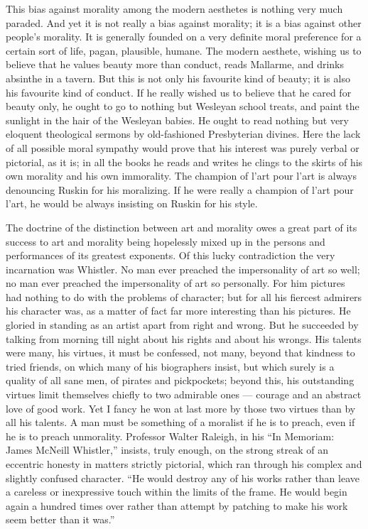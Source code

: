 This bias against morality among the modern aesthetes is nothing very much paraded. And yet it is not really a bias against morality; it is a bias against other people’s morality. It is generally founded on a very definite moral preference for a certain sort of life, pagan, plausible, humane. The modern aesthete, wishing us to believe that he values beauty more than conduct, reads Mallarme, and drinks absinthe in a tavern. But this is not only his favourite kind of beauty; it is also his favourite kind of conduct. If he really wished us to believe that he cared for beauty only, he ought to go to nothing but Wesleyan school treats, and paint the sunlight in the hair of the Wesleyan babies. He ought to read nothing but very eloquent theological sermons by old-fashioned Presbyterian divines. Here the lack of all possible moral sympathy would prove that his interest was purely verbal or pictorial, as it is; in all the books he reads and writes he clings to the skirts of his own morality and his own immorality. The champion of l’art pour l’art is always denouncing Ruskin for his moralizing. If he were really a champion of l’art pour l’art, he would be always insisting on Ruskin for his style.

The doctrine of the distinction between art and morality owes a great part of its success to art and morality being hopelessly mixed up in the persons and performances of its greatest exponents. Of this lucky contradiction the very incarnation was Whistler. No man ever preached the impersonality of art so well; no man ever preached the impersonality of art so personally. For him pictures had nothing to do with the problems of character; but for all his fiercest admirers his character was, as a matter of fact far more interesting than his pictures. He gloried in standing as an artist apart from right and wrong. But he succeeded by talking from morning till night about his rights and about his wrongs. His talents were many, his virtues, it must be confessed, not many, beyond that kindness to tried friends, on which many of his biographers insist, but which surely is a quality of all sane men, of pirates and pickpockets; beyond this, his outstanding virtues limit themselves chiefly to two admirable ones — courage and an abstract love of good work. Yet I fancy he won at last more by those two virtues than by all his talents. A man must be something of a moralist if he is to preach, even if he is to preach unmorality. Professor Walter Raleigh, in his “In Memoriam: James McNeill Whistler,” insists, truly enough, on the strong streak of an eccentric honesty in matters strictly pictorial, which ran through his complex and slightly confused character. “He would destroy any of his works rather than leave a careless or inexpressive touch within the limits of the frame. He would begin again a hundred times over rather than attempt by patching to make his work seem better than it was.”

